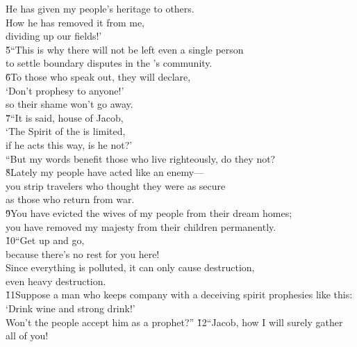 \begin{poetry}
\poemlll       He has given my people's heritage to others. \\
\poemll    How he has removed it from me, \\
\poemlll       dividing up our fields!' \\
\poeml \v{5}``This is why there will not be left even a single person \\
\poemll    to settle boundary disputes in the 's community. \\
\poeml \v{6}To those who speak out, they will declare, \\
\poemll    `Don't prophesy to anyone!' \\
\poemlll       so their shame won't go away. \\
\poeml \v{7}``It is said, house of Jacob, \\
\poemll    `The Spirit of the  is limited, \\
\poemlll       if he acts this way, is he not?' \\
\poeml ``But my words benefit those who live righteously, do they not? \\
\poeml \v{8}Lately my people have acted like an enemy--- \\
\poemll    you strip travelers who thought they were as secure \\
\poemlll       as those who return from war. \\
\poeml \v{9}You have evicted the wives of my people from their dream homes; \\
\poemll    you have removed my majesty from their children permanently. \\
\poeml \v{10}``Get up and go, \\
\poemll    because there's no rest for you here! \\
\poeml Since everything is polluted, it can only cause destruction, \\
\poemll    even heavy destruction. \\
\poeml \v{11}Suppose a man who keeps company with a deceiving spirit prophesies like this: \\
\poemll    `Drink wine and strong drink!' \\
\poemlll       Won't the people accept him as a prophet?''
\poeml \v{12}``Jacob, how I will surely gather all of you! \\

\end{poetry}

